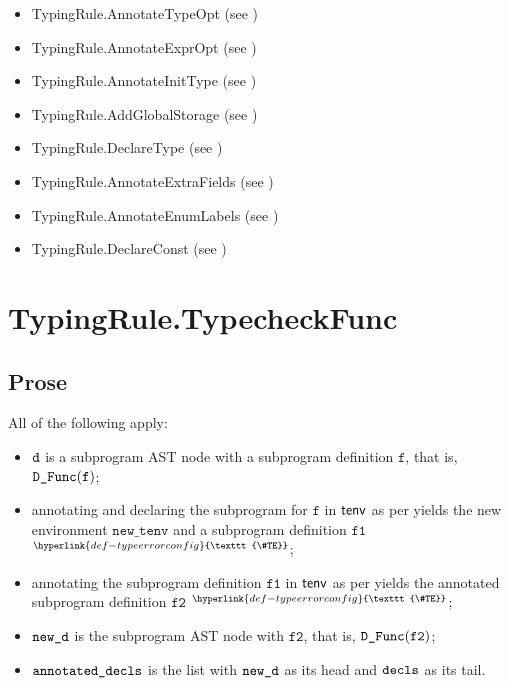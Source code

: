 \documentclass{book}
\newcommand\TypeErrorConfig[0]{\hyperlink{def-typeerrorconfig}{\texttt{\#TE}}}
\newcommand\ProseOrTypeError[0]{\hyperlink{def-proseortypeerror}{$^{\TypeErrorConfig}$}}
\newcommand\newtenv[0]{\texttt{new\_tenv}}
\newcommand\vf[0]{\texttt{f}}
\newcommand\vfone[0]{\texttt{f1}}
\newcommand\vftwo[0]{\texttt{f2}}
\begin{document}
\begin{itemize}
  \item TypingRule.AnnotateTypeOpt (see )
  \item TypingRule.AnnotateExprOpt (see )
  \item TypingRule.AnnotateInitType (see )
  \item TypingRule.AddGlobalStorage (see )
  \item TypingRule.DeclareType (see )
  \item TypingRule.AnnotateExtraFields (see )
  \item TypingRule.AnnotateEnumLabels (see )
  \item TypingRule.DeclareConst (see )
\end{itemize}

\section{TypingRule.TypecheckFunc \label{sec:TypingRule.TypecheckFunc}}
\subsection{Prose}
All of the following apply:
\begin{itemize}
  \item $\texttt{d}$ is a subprogram AST node with a subprogram definition $\vf$, that is, $\DFunc(\vf)$;
  \item annotating and declaring the subprogram for $\vf$ in $\textsf{tenv}$ as per 
        yields the new environment $\newtenv$ and a subprogram definition $\vfone$ \ProseOrTypeError;
  \item annotating the subprogram definition $\vfone$ in $\textsf{tenv}$ as per  yields
        the annotated subprogram definition $\vftwo$ \ProseOrTypeError;
  \item $\texttt{new\_d}$ is the subprogram AST node with $\vftwo$, that is, $\DFunc(\vftwo)$;
  \item $\texttt{annotated\_decls}$ is the list with $\texttt{new\_d}$ as its head and $\texttt{decls}$ as its tail.
\end{itemize}
\end{document}
